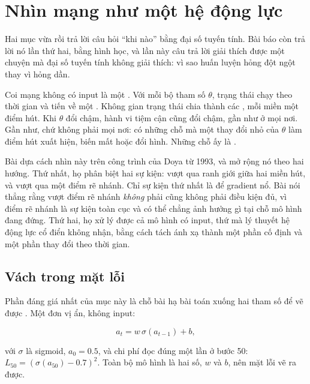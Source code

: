 \section{Nhìn mạng như một hệ động lực}
\label{sec:ch03-he-dong-luc}

%
Hai mục vừa rồi trả lời câu hỏi \enquote{khi nào} bằng đại số tuyến tính. Bài
báo còn trả lời nó lần thứ hai, bằng hình học, và lần này câu trả lời giải
thích được một chuyện mà đại số tuyến tính không giải thích: vì sao huấn luyện
hỏng đột ngột thay vì hỏng dần.

Coi mạng không có input là một . Với mỗi bộ
tham số \(\theta\), trạng thái chạy theo thời gian và tiến về một
. Không gian trạng thái chia thành các
, mỗi miền một điểm hút. Khi \(\theta\) đổi
chậm, hành vi tiệm cận cũng đổi chậm, gần như ở mọi nơi. Gần như, chứ không
phải mọi nơi: có những chỗ mà một thay đổi nhỏ của \(\theta\) làm điểm hút xuất
hiện, biến mất hoặc đổi hình. Những chỗ ấy là
.

Bài dựa cách nhìn này trên công trình của Doya từ 1993, và mở rộng nó theo hai
hướng. Thứ nhất, họ phân biệt hai sự kiện: vượt qua ranh giới giữa hai miền hút,
và vượt qua một điểm rẽ nhánh. Chỉ sự kiện thứ nhất là  để gradient
nổ. Bài nói thẳng rằng vượt điểm rẽ nhánh \emph{không} phải  cũng
không phải điều kiện đủ, vì điểm rẽ nhánh là sự kiện toàn cục và có thể chẳng
ảnh hưởng gì tại chỗ mô hình đang đứng. Thứ hai, họ xử lý được cả mô hình có
input, thứ mà lý thuyết hệ động lực cổ điển không nhận, bằng cách tách ánh xạ
thành một phần cố định và một phần thay đổi theo thời gian.

\subsection*{Vách trong mặt lỗi}

%
Phần đáng giá nhất của mục này là chỗ bài hạ bài toán xuống hai tham số để vẽ
được . Một đơn vị ẩn, không input:

\begin{equation}
  a_t = w\, \sigma(a_{t-1}) + b,
  \label{eq:ch03-mo-hinh-mot-don-vi}
\end{equation}

với \(\sigma\) là sigmoid, \(a_0 = 0.5\), và chi phí đọc đúng một lần ở bước 50:
\(L_{50} = (\sigma(a_{50}) - 0.7)^2\). Toàn bộ mô hình là hai số,
\(w\) và \(b\), nên mặt lỗi vẽ ra được.

